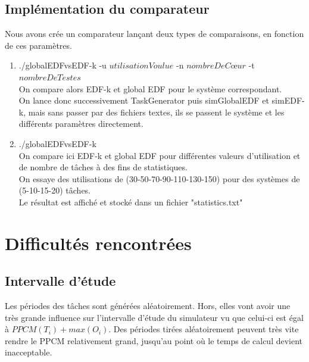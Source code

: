 \documentclass[a4paper,10pt]{article}
\begin{document}
	\subsection{Implémentation du comparateur}
		Nous avons crée un comparateur lançant deux types de comparaisons, en fonction de ces paramètres.
		\begin{enumerate}
			\item ./globalEDFvsEDF-k -u $utilisationVoulue$ -n $nombreDeCœur$ -t $nombreDeTestes$\\
					On compare alors EDF-k et global EDF pour le système correspondant.\\
					On lance donc successivement TaskGenerator puis simGlobalEDF et simEDF-k, mais sans passer par des fichiers textes, ils se passent le système et les différents paramètres directement.
			\item ./globalEDFvsEDF-k\\
					On compare ici EDF-k et global EDF pour différentes valeurs d'utilisation et de nombre de tâches à des fins de statistiques.\\
					On essaye des utilisations de (30-50-70-90-110-130-150) pour des systèmes de (5-10-15-20) tâches.\\
					Le résultat est affiché et stocké dans un fichier "statistics.txt"
		\end{enumerate}
		
		
\section{Difficultés rencontrées}

	\subsection{Intervalle d'étude}

		Les périodes des tâches sont générées aléatoirement. Hors, elles vont avoir une très grande influence sur l'intervalle d'étude du simulateur vu que 		celui-ci est égal à $PPCM(T_i)+ max(O_i)$. Des périodes tirées aléatoirement peuvent très vite rendre le PPCM relativement grand, jusqu'au point où 		le temps de calcul devient inacceptable.
\end{document}
